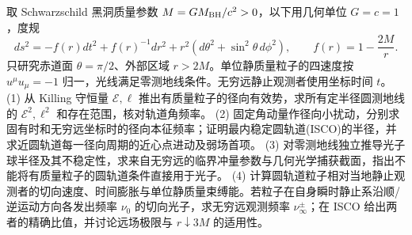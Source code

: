 取 Schwarzschild 黑洞质量参数 \(M=GM_{\rm BH}/c^2>0\)，以下用几何单位 \(G=c=1\)，度规
\[
ds^2=-f(r)dt^2+f(r)^{-1}dr^2+r^2(d\theta^2+\sin^2\theta\,d\phi^2),\qquad f(r)=1-\frac{2M}{r}.
\]
只研究赤道面 \(\theta=\pi/2\)、外部区域 \(r>2M\)。单位静质量粒子的四速度按 \(u^\mu u_\mu=-1\) 归一，光线满足零测地线条件。无穷远静止观测者使用坐标时间 \(t\)。
(1) 从 Killing 守恒量 \(\mathcal E,\ell\) 推出有质量粒子的径向有效势，求所有定半径圆测地线的 \(\mathcal E^2,\ell^2\) 和存在范围，核对轨道角频率。
(2) 固定角动量作径向小扰动，分别求固有时和无穷远坐标时的径向本征频率；证明最内稳定圆轨道(ISCO)的半径，并求近圆轨道每一径向周期的近心点进动及弱场首项。
(3) 对零测地线独立推导光子球半径及其不稳定性，求来自无穷远的临界冲量参数与几何光学捕获截面，指出不能将有质量粒子的圆轨道条件直接用于光子。
(4) 计算圆轨道粒子相对当地静止观测者的切向速度、时间膨胀与单位静质量束缚能。若粒子在自身瞬时静止系沿顺/逆运动方向各发出频率 \(\nu_0\) 的切向光子，求无穷远观测频率 \(\nu_\infty^\pm\)；在 ISCO 给出两者的精确比值，并讨论远场极限与 \(r\downarrow3M\) 的适用性。
